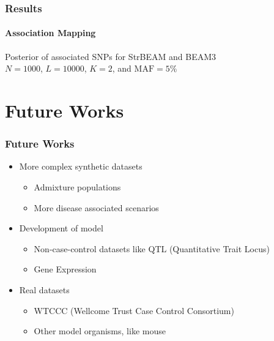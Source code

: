 \documentclass[xcolor=dvipsnames, professionalfont]{beamer}
\begin{document}
\begin{frame}
\frametitle{Results}
\framesubtitle{Association Mapping}
Posterior of associated SNPs for StrBEAM and BEAM3\\
$N=1000$, $L=10000$, $K=2$, and $\text{MAF}=5\%$
\begin{figure}[!ht]
\centering
{}
\label{fig:ThreeWayNoCluster}
\end{figure}
\end{frame}



\section{Future Works}
\begin{frame}
\frametitle{Future Works}
\begin{itemize}
\item More complex synthetic datasets
	\begin{itemize}
	\item Admixture populations
	\item More disease associated scenarios
	\end{itemize} \pause
\item Development of model
	\begin{itemize}
	\item Non-case-control datasets like QTL (Quantitative Trait Locus)
	\item Gene Expression
	\end{itemize} \pause
\item Real datasets
	\begin{itemize}
	\item WTCCC (Wellcome Trust Case Control Consortium)
	\item Other model organisms, like mouse
	\end{itemize}
\end{itemize}
\end{frame}
\end{document}
